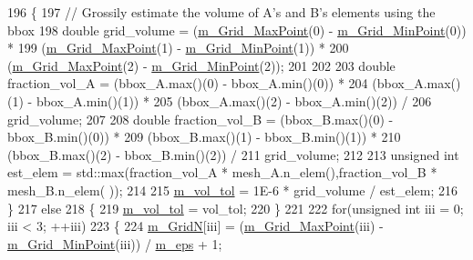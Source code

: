 \begin{DoxyCode}
196     \{
197         \textcolor{comment}{// Grossily estimate the volume of A's and B's elements using the bbox}
198         \textcolor{keywordtype}{double} grid\_volume    =     (\hyperlink{classcarl_1_1_mesh___intersection_a98f86004df38485ed880b054b94f5c7d}{m\_Grid\_MaxPoint}(0) - 
      \hyperlink{classcarl_1_1_mesh___intersection_a415abd921fae83d405751d1dcc0957db}{m\_Grid\_MinPoint}(0)) *
199                                     (\hyperlink{classcarl_1_1_mesh___intersection_a98f86004df38485ed880b054b94f5c7d}{m\_Grid\_MaxPoint}(1) - 
      \hyperlink{classcarl_1_1_mesh___intersection_a415abd921fae83d405751d1dcc0957db}{m\_Grid\_MinPoint}(1)) *
200                                     (\hyperlink{classcarl_1_1_mesh___intersection_a98f86004df38485ed880b054b94f5c7d}{m\_Grid\_MaxPoint}(2) - 
      \hyperlink{classcarl_1_1_mesh___intersection_a415abd921fae83d405751d1dcc0957db}{m\_Grid\_MinPoint}(2));
201 
202 
203         \textcolor{keywordtype}{double} fraction\_vol\_A =     (bbox\_A.max()(0) - bbox\_A.min()(0)) *
204                                     (bbox\_A.max()(1) - bbox\_A.min()(1)) *
205                                     (bbox\_A.max()(2) - bbox\_A.min()(2)) /
206                                     grid\_volume;
207 
208         \textcolor{keywordtype}{double} fraction\_vol\_B =     (bbox\_B.max()(0) - bbox\_B.min()(0)) *
209                                     (bbox\_B.max()(1) - bbox\_B.min()(1)) *
210                                     (bbox\_B.max()(2) - bbox\_B.min()(2)) /
211                                     grid\_volume;
212 
213         \textcolor{keywordtype}{unsigned} \textcolor{keywordtype}{int} est\_elem =   std::max(fraction\_vol\_A * mesh\_A.n\_elem(),fraction\_vol\_B * mesh\_B.n\_elem(
      ));
214 
215         \hyperlink{classcarl_1_1_mesh___intersection_ad282e724c75087a90026854992ec0809}{m\_vol\_tol} = 1E-6 * grid\_volume / est\_elem;
216     \}
217     \textcolor{keywordflow}{else}
218     \{
219         \hyperlink{classcarl_1_1_mesh___intersection_ad282e724c75087a90026854992ec0809}{m\_vol\_tol} = vol\_tol;
220     \}
221 
222     \textcolor{keywordflow}{for}(\textcolor{keywordtype}{unsigned} \textcolor{keywordtype}{int} iii = 0; iii < 3; ++iii)
223     \{
224         \hyperlink{classcarl_1_1_mesh___intersection_a74b7064e400e0dbf8c62eb7efef1b784}{m\_GridN}[iii] = (\hyperlink{classcarl_1_1_mesh___intersection_a98f86004df38485ed880b054b94f5c7d}{m\_Grid\_MaxPoint}(iii) - 
      \hyperlink{classcarl_1_1_mesh___intersection_a415abd921fae83d405751d1dcc0957db}{m\_Grid\_MinPoint}(iii)) / \hyperlink{classcarl_1_1_mesh___intersection_a2b2a46afcfa01b2763315f439bd0a4d6}{m\_eps} + 1;

\end{DoxyCode}
